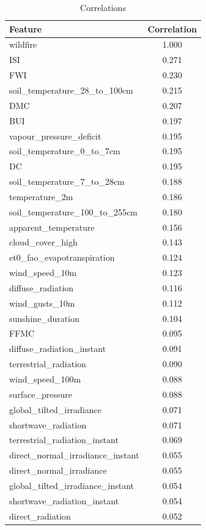 \begin{table}[H]
	\caption{Correlations}
	\centering
	\label{correlations}
	\begin{tabular}{lc}
		\hline
		Feature & Correlation \\ \hline
		wildfire & 1.000 \\
		ISI & 0.271 \\
		FWI & 0.230 \\
		soil\_temperature\_28\_to\_100cm & 0.215 \\
		DMC & 0.207 \\
		BUI & 0.197 \\
		vapour\_pressure\_deficit & 0.195 \\
		soil\_temperature\_0\_to\_7cm & 0.195 \\
		DC & 0.195 \\
		soil\_temperature\_7\_to\_28cm & 0.188 \\
		temperature\_2m & 0.186 \\
		soil\_temperature\_100\_to\_255cm & 0.180 \\
		apparent\_temperature & 0.156 \\
		cloud\_cover\_high & 0.143 \\
		et0\_fao\_evapotranspiration & 0.124 \\
		wind\_speed\_10m & 0.123 \\
		diffuse\_radiation & 0.116 \\
		wind\_gusts\_10m & 0.112 \\
		sunshine\_duration & 0.104 \\
		FFMC & 0.095 \\
		diffuse\_radiation\_instant & 0.091 \\
		terrestrial\_radiation & 0.090 \\
		wind\_speed\_100m & 0.088 \\
		surface\_pressure & 0.088 \\
		global\_tilted\_irradiance & 0.071 \\
		shortwave\_radiation & 0.071 \\
		terrestrial\_radiation\_instant & 0.069 \\
		direct\_normal\_irradiance\_instant & 0.055 \\
		direct\_normal\_irradiance & 0.055 \\
		global\_tilted\_irradiance\_instant & 0.054 \\
		shortwave\_radiation\_instant & 0.054 \\
		direct\_radiation & 0.052 \\

\end{tabular}
\end{table}
